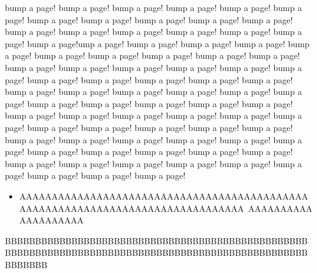 \documentclass[11pt]{book}
\begin{document}
bump a page! bump a page! bump a page! bump a page! bump a page! bump a page! bump a
page! bump a page! bump a page!
bump a page! bump a page! bump a page! bump a page! bump a page! bump a page! bump a
page! bump a page! bump a page!ump a page! bump a page! bump a page! bump a page! bump a page! bump a page! bump a
page! bump a page! bump a page!
bump a page! bump a page! bump a page! bump a page! bump a page! bump a page! bump a
page! bump a page! bump a page!
bump a page! bump a page! bump a page! bump a page! bump a page! bump a page! bump a
page! bump a page! bump a page!
bump a page! bump a page! bump a page! bump a page! bump a page! bump a page! bump a
page! bump a page! bump a page!
bump a page! bump a page! bump a page! bump a page! bump a page! bump a page! bump a
page! bump a page! bump a page!
bump a page! bump a page! bump a page! bump a page! bump a page! bump a page! bump a
page! bump a page! bump a page!
bump a page! bump a page! bump a page! bump a page! bump a page! bump a page! bump a
page! bump a page! bump a page!

\begin{itemize}
\item AAAAAAAAAAAAAAAAAAAAAAAAAAAAAAAAAAAAAAAAAAAAAAAAAAAAAAAAAAAAAAAAAAAAAAAAAAAAAAAA\
AAAAAAAAAAAAAAAAAAAA
\end{itemize}
BBBBBBBBBBBBBBBBBBBBBBBBBBBBBBBBBBBBBBBBBBBBBBBBBBBBBBBBBBBBBBBBBBBBBBBBBBBBBBBBBBBBBBBBBBBBBBBBBBBBBBBBBBB
\end{document}
